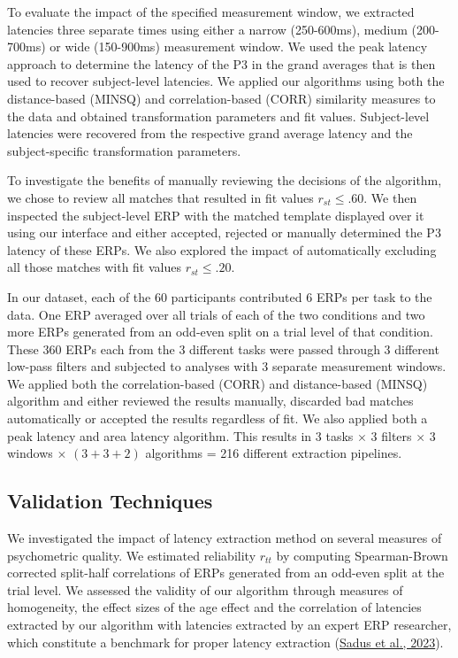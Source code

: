 \documentclass[
  man]{apa7}
\begin{document}
To evaluate the impact of the specified measurement window, we extracted latencies three separate times using either a narrow (250-600ms), medium (200-700ms) or wide (150-900ms) measurement window. We used the peak latency approach to determine the latency of the P3 in the grand averages that is then used to recover subject-level latencies. We applied our algorithms using both the distance-based (MINSQ) and correlation-based (CORR) similarity measures to the data and obtained transformation parameters and fit values. Subject-level latencies were recovered from the respective grand average latency and the subject-specific transformation parameters.

To investigate the benefits of manually reviewing the decisions of the algorithm, we chose to review all matches that resulted in fit values \(r_{st} \le .60\). We then inspected the subject-level ERP with the matched template displayed over it using our interface and either accepted, rejected or manually determined the P3 latency of these ERPs.
We also explored the impact of automatically excluding all those matches with fit values \(r_{st} \le .20\).

In our dataset, each of the 60 participants contributed 6 ERPs per task to the data. One ERP averaged over all trials of each of the two conditions and two more ERPs generated from an odd-even split on a trial level of that condition. These 360 ERPs each from the 3 different tasks were passed through 3 different low-pass filters and subjected to analyses with 3 separate measurement windows. We applied both the correlation-based (CORR) and distance-based (MINSQ) algorithm and either reviewed the results manually, discarded bad matches automatically or accepted the results regardless of fit. We also applied both a peak latency and area latency algorithm. This results in 3 tasks \(\times\) 3 filters \(\times\) 3 windows \(\times\) \((3 + 3 + 2)\) algorithms = 216 different extraction pipelines.

\hypertarget{validation-techniques}{%
\subsection{Validation Techniques}\label{validation-techniques}}

We investigated the impact of latency extraction method on several measures of psychometric quality. We estimated reliability \(r_{tt}\) by computing Spearman-Brown corrected split-half correlations of ERPs generated from an odd-even split at the trial level. We assessed the validity of our algorithm through measures of homogeneity, the effect sizes of the age effect and the correlation of latencies extracted by our algorithm with latencies extracted by an expert ERP researcher, which constitute a benchmark for proper latency extraction (\protect\hyperlink{ref-sadus2023multiverse}{Sadus et al., 2023}).
\end{document}
